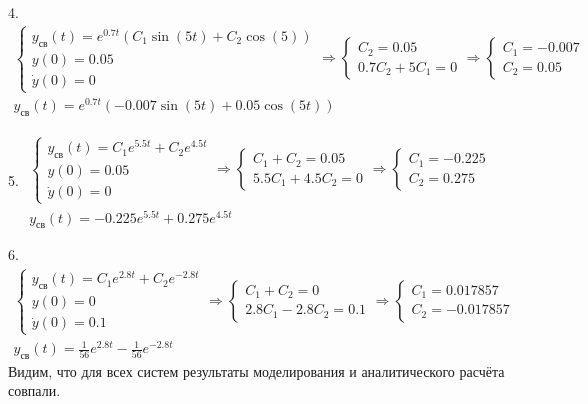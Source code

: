 \vspace{1em}

4. $\begin{array}{l}
\left\lbrace \begin{array}{c}
y_{св} (t)=e^{0.7t} (C_1 \sin (5t)+C_2 \cos (5))\\
y(0)=0.05\\
\dot{y} (0)=0
\end{array}\right.\Rightarrow \left\lbrace \begin{array}{c}
C_2 =0.05\\
0.7C_2 +5C_1 =0
\end{array}\right.\Rightarrow \left\lbrace \begin{array}{c}
C_1 =-0.007\\
C_2 =0.05
\end{array}\right.\\
y_{\textrm{св}} (t)=e^{0.7t} (-0.007\sin (5t)+0.05\cos (5t))
\end{array}$

\vspace{1em}

5. $\begin{array}{l}
\left\lbrace \begin{array}{c}
y_{св} (t)=C_1 e^{5.5t} +C_2 e^{4.5t} \\
y(0)=0.05\\
\dot{y} (0)=0
\end{array}\right.\Rightarrow \left\lbrace \begin{array}{c}
C_1 +C_2 =0.05\\
5.5C_1 +4.5C_2 =0
\end{array}\right.\Rightarrow \left\lbrace \begin{array}{c}
C_1 =-0.225\\
C_2 =0.275
\end{array}\right.\\
y_{\textrm{св}} (t)=-0.225e^{5.5t} +0.275e^{4.5t} 
\end{array}$

\vspace{1em}

6. $\begin{array}{l}
\left\lbrace \begin{array}{c}
y_{св} (t)=C_1 e^{2.8t} +C_2 e^{-2.8t} \\
y(0)=0\\
\dot{y} (0)=0.1
\end{array}\right.\Rightarrow \left\lbrace \begin{array}{c}
C_1 +C_2 =0\\
2.8C_1 -2.8C_2 =0.1
\end{array}\right.\Rightarrow \left\lbrace \begin{array}{c}
C_1 =0.017857\\
C_2 =-0.017857
\end{array}\right.\\
y_{\textrm{св}} (t)=\frac{1}{56}e^{2.8t} -\frac{1}{56}e^{-2.8t} 
\end{array}$
\\
Видим, что для всех систем результаты моделирования и аналитического расчёта совпали.\\

